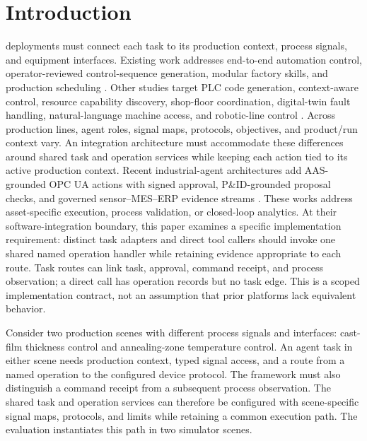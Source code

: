 \section{Introduction}
 deployments must connect each task to its
production context, process signals, and equipment interfaces. Existing work
addresses end-to-end automation control, operator-reviewed control-sequence
generation, modular factory skills, and production scheduling
\cite{xia2025control,huang2026made,koehle2026llmdriven,waseem2026pretrained}.
Other studies target PLC code generation, context-aware control, resource
capability discovery, shop-floor coordination, digital-twin fault handling,
natural-language machine access, and robotic-line control
\cite{liu2026agents4plc,wu2025instructmpc,lim2025llmenabled,zhao2026shopfloor,gill2025llmdt,hofmann2025nlc}.
Across production lines, agent roles, signal maps, protocols, objectives, and
product/run context vary. An integration architecture must accommodate these
differences around shared task and operation services while keeping each
action tied to its active production context. Recent industrial-agent
architectures add AAS-grounded OPC UA actions with signed approval,
P\&ID-grounded proposal checks, and governed sensor--MES--ERP evidence
streams \cite{graul2026aas,schall2026safe,lin2026agentic}. These works address
asset-specific execution, process validation, or closed-loop analytics. At
their software-integration boundary, this paper examines a specific
implementation requirement: distinct task adapters and direct tool callers
should invoke one shared named operation handler while retaining evidence
appropriate to each route. Task routes can link task, approval, command
receipt, and process observation; a direct call has operation records but no
task edge. This is a scoped implementation contract, not an assumption that
prior platforms lack equivalent behavior.

Consider two production scenes with different process signals and interfaces:
cast-film thickness control and annealing-zone temperature control. An agent
task in either scene needs production context, typed signal access, and a
route from a named operation to the configured device protocol. The framework
must also distinguish a command receipt from a subsequent process
observation. The shared task and operation services can therefore be
configured with scene-specific signal maps, protocols, and limits while
retaining a common execution path. The evaluation instantiates this path in
two simulator scenes.


